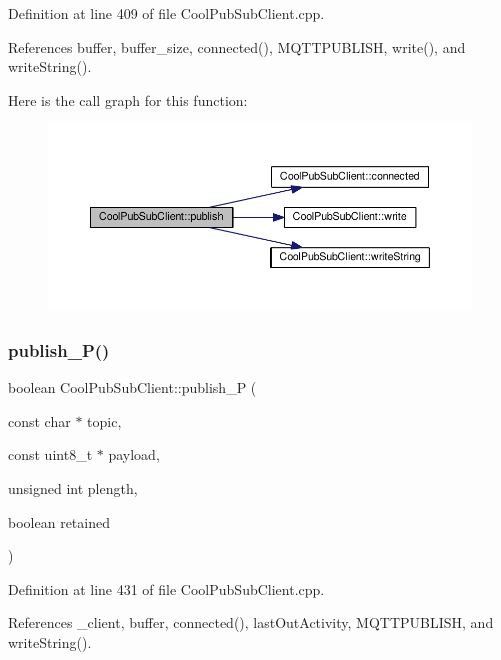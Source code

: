 Definition at line 409 of file Cool\+Pub\+Sub\+Client.\+cpp.



References buffer, buffer\+\_\+size, connected(), M\+Q\+T\+T\+P\+U\+B\+L\+I\+SH, write(), and write\+String().

Here is the call graph for this function\+:\nopagebreak
\begin{figure}[H]
\begin{center}
\leavevmode
\includegraphics[width=350pt]{d8/d4b/class_cool_pub_sub_client_adef968760eb87b70e3fed03e60da76f7_cgraph}
\end{center}
\end{figure}
\mbox{\label{class_cool_pub_sub_client_a55458d47cf01f590e9b6647d5a418ab6}} 
\subsubsection{\texorpdfstring{publish\+\_\+\+P()}{publish\_P()}}
{\footnotesize\ttfamily boolean Cool\+Pub\+Sub\+Client\+::publish\+\_\+P (\begin{DoxyParamCaption}\item[{const char $\ast$}]{topic,  }\item[{const uint8\+\_\+t $\ast$}]{payload,  }\item[{unsigned int}]{plength,  }\item[{boolean}]{retained }\end{DoxyParamCaption})}



Definition at line 431 of file Cool\+Pub\+Sub\+Client.\+cpp.



References \+\_\+client, buffer, connected(), last\+Out\+Activity, M\+Q\+T\+T\+P\+U\+B\+L\+I\+SH, and write\+String().

